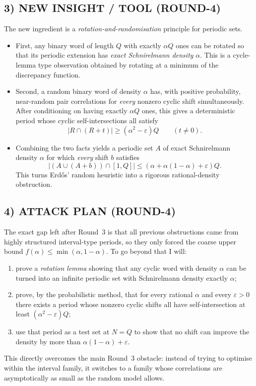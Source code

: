 \subsection*{3) NEW INSIGHT / TOOL (ROUND-4)}
The new ingredient is a \emph{rotation-and-randomisation} principle for periodic sets.

\begin{itemize}
\item First, any binary word of length $Q$ with exactly $\alpha Q$ ones can be rotated so that its periodic extension has \emph{exact Schnirelmann density} $\alpha$. This is a cycle-lemma type observation obtained by rotating at a minimum of the discrepancy function.
\item Second, a random binary word of density $\alpha$ has, with positive probability, near-random pair correlations for \emph{every} nonzero cyclic shift simultaneously. After conditioning on having exactly $\alpha Q$ ones, this gives a deterministic period whose cyclic self-intersections all satisfy
\[
|R\cap(R+t)|\ge (\alpha^2-\varepsilon)Q
\qquad (t\neq 0).
\]
\item Combining the two facts yields a periodic set $A$ of exact Schnirelmann density $\alpha$ for which \emph{every} shift $b$ satisfies
\[
|(A\cup(A+b))\cap[1,Q]|\le (\alpha+\alpha(1-\alpha)+\varepsilon)Q.
\]
This turns Erd\H{o}s' random heuristic into a rigorous rational-density obstruction.
\end{itemize}

\subsection*{4) ATTACK PLAN (ROUND-4)}
The exact gap left after Round~3 is that all previous obstructions came from highly structured interval-type periods, so they only forced the coarse upper bound $f(\alpha)\le \min(\alpha,1-\alpha)$. To go beyond that I will:
\begin{enumerate}
\item prove a \emph{rotation lemma} showing that any cyclic word with density $\alpha$ can be turned into an infinite periodic set with Schnirelmann density exactly $\alpha$;
\item prove, by the probabilistic method, that for every rational $\alpha$ and every $\varepsilon>0$ there exists a period whose nonzero cyclic shifts all have self-intersection at least $(\alpha^2-\varepsilon)Q$;
\item use that period as a test set at $N=Q$ to show that no shift can improve the density by more than $\alpha(1-\alpha)+\varepsilon$.
\end{enumerate}
This directly overcomes the main Round~3 obstacle: instead of trying to optimise within the interval family, it switches to a family whose correlations are asymptotically as small as the random model allows.


